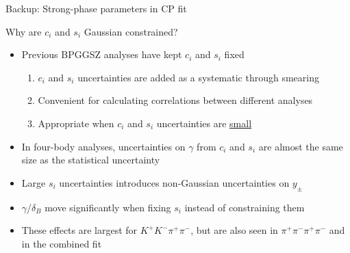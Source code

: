 \documentclass[xcolor={dvipsnames}]{beamer}
\begin{document}
\begin{frame}{Backup: Strong-phase parameters in CP fit}
  \begin{center}
    {\large Why are $c_i$ and $s_i$ Gaussian constrained?}
  \end{center}
  \begin{itemize}
    \setlength\itemsep{1.0em}
    \item{Previous BPGGSZ analyses have kept $c_i$ and $s_i$ fixed}
    \begin{enumerate}
      \item{$c_i$ and $s_i$ uncertainties are added as a systematic through smearing}
      \item{Convenient for calculating correlations between different analyses}
      \item{Appropriate when $c_i$ and $s_i$ uncertainties are \underline{small}}
    \end{enumerate}
    \item{In four-body analyses, uncertainties on $\gamma$ from $c_i$ and $s_i$ are almost the same size as the statistical uncertainty}
    \item{Large $s_i$ uncertainties introduces non-Gaussian uncertainties on $y_\pm$}
    \item{$\gamma$/$\delta_B$ move significantly when fixing $s_i$ instead of constraining them}
    \item{These effects are largest for $K^+K^-\pi^+\pi^-$, but are also seen in $\pi^+\pi^-\pi^+\pi^-$ and in the combined fit}
  \end{itemize}
\end{frame}
\end{document}
